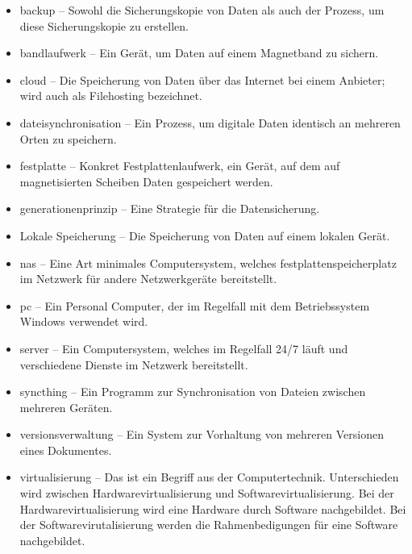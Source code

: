 \begin{itemize}
    \item \gls{backup} -- Sowohl die Sicherungskopie von Daten als auch der
          Prozess, um diese Sicherungskopie zu erstellen.
    \item \gls{bandlaufwerk} -- Ein Gerät, um Daten auf einem Magnetband
          zu sichern.
    \item \gls{cloud} -- Die Speicherung von Daten über das Internet bei
          einem Anbieter; wird auch als Filehosting bezeichnet.
    \item \gls{dateisynchronisation} -- Ein Prozess, um digitale Daten
          identisch an mehreren Orten zu speichern.
    \item \gls{festplatte} -- Konkret Festplattenlaufwerk, ein Gerät,
          auf dem auf magnetisierten Scheiben Daten gespeichert werden.
    \item \gls{generationenprinzip} -- Eine Strategie für die Datensicherung.
    \item Lokale Speicherung -- Die Speicherung von Daten auf einem lokalen
          Gerät.
    \item \gls{nas} -- Eine Art minimales Computersystem, welches
          \gls{festplatte}nspeicherplatz im Netzwerk für andere Netzwerkgeräte
          bereitstellt.
    \item \gls{pc} -- Ein Personal Computer, der im Regelfall mit dem
          Betriebssystem Windows verwendet wird.
    \item \gls{server} -- Ein
          Computersystem, welches im Regelfall 24/7 läuft und verschiedene
          Dienste im Netzwerk bereitstellt.
    \item \gls{syncthing} -- Ein Programm zur Synchronisation von Dateien
          zwischen mehreren Geräten.
    \item \gls{versionsverwaltung} -- Ein System zur Vorhaltung von mehreren
          Versionen eines Dokumentes.
    \item \gls{virtualisierung} -- Das ist ein Begriff aus der Computertechnik.
          Unterschieden wird zwischen Hardwarevirtualisierung und
          Softwarevirtualisierung. Bei der Hardwarevirtualisierung wird eine
          Hardware durch Software nachgebildet. Bei der Softwarevirutalisierung
          werden die Rahmenbedigungen für eine Software nachgebildet.
\end{itemize}
